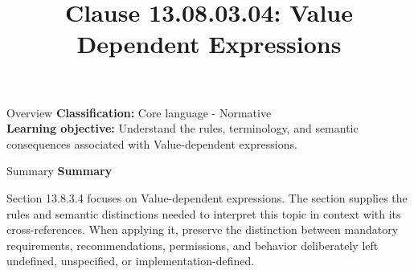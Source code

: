 \documentclass[10pt,letterpaper]{article}
\title{Clause 13.08.03.04: Value Dependent Expressions}
\author{}
\date{}
\begin{document}
\maketitle
\begin{CornellOverviewBox}{Overview}
\textbf{Classification:} Core language - Normative\\[2pt]
\textbf{Learning objective:} Understand the rules, terminology, and semantic consequences associated with Value-dependent expressions.
\end{CornellOverviewBox}\begin{CornellSummaryBox}{Summary}
{\sffamily\bfseries\color{Accent} Summary}\par\vspace{3pt}Section 13.8.3.4 focuses on Value-dependent expressions. The section supplies the rules and semantic distinctions needed to interpret this topic in context with its cross-references. When applying it, preserve the distinction between mandatory requirements, recommendations, permissions, and behavior deliberately left undefined, unspecified, or implementation-defined.
\end{CornellSummaryBox}
\end{document}
